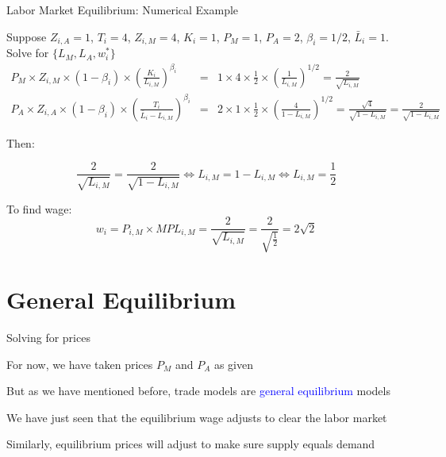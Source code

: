 \documentclass[notes,11pt, aspectratio=169, xcolor=table]{beamer}
\newcommand{\blue}[1]{\textcolor{blue}{#1}}
\newenvironment{wideitemize}{\itemize\addtolength{\itemsep}{10pt}}{\enditemize}
\begin{document}
\begin{frame}{Labor Market Equilibrium: Numerical Example}
    \begin{wideitemize}
        \item Suppose $Z_{i,A} = 1$, $T_i = 4$, $Z_{i,M} = 4$, $K_i = 1$, $P_M=1$, $P_A=2$, $\beta_i=1/2$, $\bar{L}_i=1$. Solve for $\{L_M,L_A,w_{i}^*\}$
    { \scriptsize
    \begin{eqnarray*}
        P_{M} \times  Z_{i,M} \times (1-\beta_i) \times \left( \frac{K_{i}}{L_{i,M}} \right)^{\beta_i} &=& 1 \times  4 \times \frac{1}{2} \times \left( \frac{1}{L_{i,M}} \right)^{1/2} =  \frac{2}{\sqrt{ L_{i,M}}} \\
        P_{A} \times  Z_{i,A} \times (1-\beta_i) \times \left( \frac{T_{i}}{\bar{L}_i - L_{i,M}} \right)^{\beta_i} &=& 2 \times  1 \times \frac{1}{2} \times \left( \frac{4}{1 - L_{i,M}} \right)^{1/2} =  \frac{\sqrt{4}}{\sqrt{1 - L_{i,M}}} =  \frac{2}{\sqrt{1 - L_{i,M}}} 
    \end{eqnarray*}
    }
    \item<2-> Then:

    \begin{equation*}
        \frac{2}{\sqrt{ L_{i,M}}} = \frac{2}{\sqrt{1 - L_{i,M}}} \iff L_{i,M} = 1 - L_{i,M} \iff L_{i,M} = \frac{1}{2}   
    \end{equation*}

    \item<3-> To find wage:
    \begin{equation*}
        w_i = P_{i,M} \times MPL_{i,M} = \frac{2}{\sqrt{ L_{i,M}}}  = \frac{2}{\sqrt{  \frac{1}{2} }} = 2\sqrt{2}
    \end{equation*} 
    \end{wideitemize}

\end{frame}

\section{General Equilibrium}

\begin{frame}{Solving for prices}
\begin{wideitemize}
    \item For now, we have taken prices $P_M$ and $P_A$ as given
    \item But as we have mentioned before, trade models are \blue{general equilibrium} models
    \item We have just seen that the equilibrium wage adjusts to clear the labor market 
    \item Similarly, equilibrium prices will adjust to make sure supply equals demand 
\end{wideitemize}
\end{frame}
\end{document}
